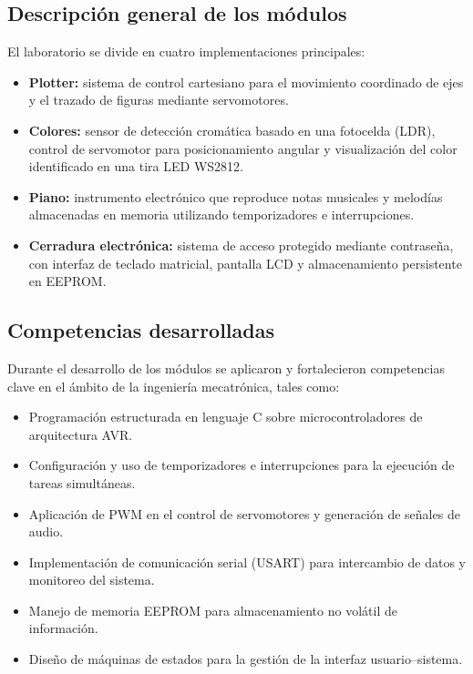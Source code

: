 \subsection{Descripción general de los módulos}

El laboratorio se divide en cuatro implementaciones principales:

\begin{itemize}
    \item \textbf{Plotter:} sistema de control cartesiano para el movimiento coordinado de ejes y el trazado de figuras mediante servomotores.
    \item \textbf{Colores:} sensor de detección cromática basado en una fotocelda (LDR), control de servomotor para posicionamiento angular y visualización del color identificado en una tira LED WS2812.
    \item \textbf{Piano:} instrumento electrónico que reproduce notas musicales y melodías almacenadas en memoria utilizando temporizadores e interrupciones.
    \item \textbf{Cerradura electrónica:} sistema de acceso protegido mediante contraseña, con interfaz de teclado matricial, pantalla LCD y almacenamiento persistente en EEPROM.
\end{itemize}

\subsection{Competencias desarrolladas}

Durante el desarrollo de los módulos se aplicaron y fortalecieron competencias clave en el ámbito de la ingeniería mecatrónica, tales como:

\begin{itemize}
    \item Programación estructurada en lenguaje C sobre microcontroladores de arquitectura AVR.
    \item Configuración y uso de temporizadores e interrupciones para la ejecución de tareas simultáneas.
    \item Aplicación de PWM en el control de servomotores y generación de señales de audio.
    \item Implementación de comunicación serial (USART) para intercambio de datos y monitoreo del sistema.
    \item Manejo de memoria EEPROM para almacenamiento no volátil de información.
    \item Diseño de máquinas de estados para la gestión de la interfaz usuario–sistema.
\end{itemize}


